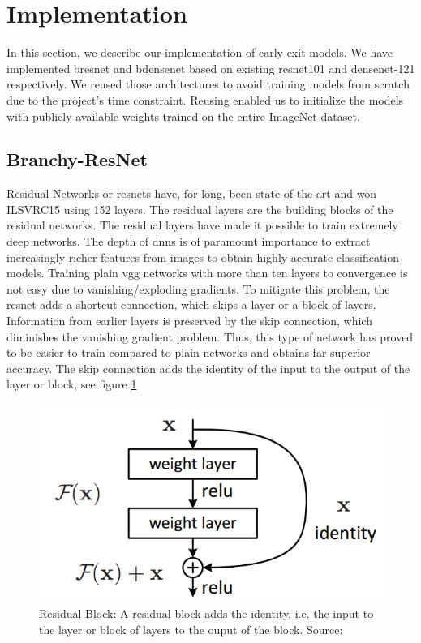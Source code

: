\section{Implementation} \label{sec:ee-implementation}

In this section, we describe our implementation of early exit models. We have implemented \gls{bresnet} and \gls{bdensenet} based on existing \gls{resnet}101 and \gls{densenet}-121 respectively. We reused those architectures to avoid training models from scratch due to the project's time constraint. Reusing enabled us to initialize the models with publicly available weights trained on the entire ImageNet dataset.

\subsection{Branchy-ResNet} 

Residual Networks or \gls{resnet}s \cite{he_deep_2015} have, for long, been state-of-the-art and won ILSVRC15 using 152 layers. The residual layers are the building blocks of the residual networks. The residual layers have made it possible to train extremely deep networks. The depth of \gls{dnn}s is of paramount importance to extract increasingly richer features from images to obtain highly accurate classification models. Training plain \gls{vgg} networks \cite{simonyan_very_2015} with more than ten layers to convergence is not easy due to vanishing/exploding gradients. To mitigate this problem, the \gls{resnet} adds a shortcut connection, which skips a layer or a block of layers. Information from earlier layers is preserved by the skip connection, which diminishes the vanishing gradient problem. Thus, this type of network has proved to be easier to train compared to plain networks and obtains far superior accuracy. The skip connection adds the identity of the input to the output of the layer or block, see figure \ref{fig:residualblock}

\begin{figure}
	\centering
	\includegraphics[width=.5\linewidth]{figures/models/residualblock}
	\caption[Residual Block]{Residual Block: A residual block adds the identity, i.e. the input to the layer or block of layers to the ouput of the block. Source:  \cite{he_deep_2015}}
	\label{fig:residualblock}
\end{figure}

